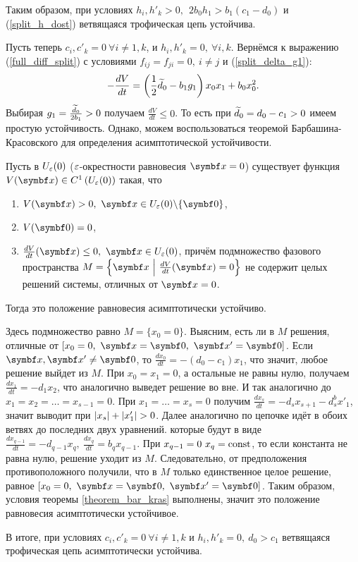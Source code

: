 Таким образом, при условиях \(h_i, h'_k > 0, ~~ 2 b_0 h_1 > b_1 (c_1 - d_0)\) и (\ref{split_h_dost}) ветвящаяся трофическая цепь устойчива.

Пусть теперь \(c_i, c'_k = 0 ~ \forall i \neq 1, k \), и \(h_i, h'_k = 0, ~ \forall i, k \). Вернёмся к выражению (\ref{full_diff_split}) с условиями \(f_{ij} = f_{ji} = 0, ~ i \neq j\) и (\ref{split_delta_g1}):
\begin{equation}
    - \frac{dV}{dt} = \left( \frac{1}{2} \widetilde{d}_0 - b_1 g_1 \right) x_0 x_1 + b_0 x_0^2.
\end{equation}
Выбирая \(g_1 = \frac{\widetilde{d}_0}{2 b_1} > 0\) получаем \(\frac{dV}{dt} \leq 0\). То есть при \(\widetilde{d}_0 = d_0 - c_1 > 0\) имеем простую устойчивость. Однако, можем воспользоваться теоремой Барбашина-Красовского\cite{barabashin_stability} для определения асимптотической устойчивости.

\begin{theorem} \label{theorem_bar_kras}
    Пусть в \(U_\varepsilon(0)\) (\(\varepsilon\)-окрестности равновесия \(\mb{x} = 0\)) существует функция \(V(\mb{x}) \in C^1\left( U_\veps(0) \right)\) такая, что
    \begin{enumerate}
        \item \(V(\mb{x}) > 0, ~ \mb{x} \in U_\veps(0) \backslash \{\mb{0}\}\),
        \item \(V(\mb{0}) = 0\),
        \item \(\frac{dV}{dt}(\mb{x}) \leq 0, ~ \mb{x} \in U_\veps(0) \), причём подмножество фазового пространства \( M = \left\{ \mb{x} ~ \Big\vert ~ \frac{dV}{dt}(\mb{x}) = 0 \right\} \) не содержит целых решений системы, отличных от \(\mb{x} = 0\).
    \end{enumerate}
    Тогда это положение равновесия асимптотически устойчиво.
\end{theorem}

Здесь подмножество равно \( M = \{ x_0 = 0 \} \). Выясним, есть ли в \(M\) решения, отличные от \( [x_0 = 0, ~ \mb{x} = \mb{0}, ~ \mb{x'} = \mb{0}] \). Если \( \mb{x}, \mb{x'} \neq \mb{0} \), то \(\frac{dx_0}{dt} = -(d_0 - c_1) x_1\), что значит, любое решение выйдет из \(M\). При \(x_0 = x_1 = 0\), а остальные не равны нулю, получаем \(\frac{dx_1}{dt} = -d_1 x_2\), что аналогично выведет решение во вне. И так аналогично до \( x_1 = x_2 = \dots = x_{s-1} = 0 \). При \(x_1 = \dots = x_{s} = 0\) получим \( \frac{d x_s}{dt} = -d_{s} x_{s+1} - d^b_s x'_1 \), значит выводит при \( \left\vert x_s \right\vert + \left\vert x'_1 \right\vert > 0\). Далее аналогично по цепочке идёт в обоих ветвях до последних двух уравнений. которые будут в виде \(\frac{dx_{q-1}}{dt} = -d_{q-1} x_q, ~ \frac{d x_q}{dt} = b_q x_{q-1}\). При \(x_{q-1} = 0 ~ x_q = \operatorname{const} \), то если константа не равна нулю, решение уходит из \(M\). Следовательно, от предположения противоположного получили, что в \(M\) только единственное целое решение, равное \( [x_0 = 0, ~ \mb{x} = \mb{0}, ~ \mb{x'} = \mb{0}] \). Таким образом, условия теоремы \eqref{theorem_bar_kras} выполнены, значит это положение равновесия асимптотически устойчивое.

В итоге, при условиях \(c_i, c'_k = 0 ~ \forall i \neq 1, k\) и \( h_i, h'_k = 0, ~ d_0 > c_1\) ветвящаяся трофическая цепь асимптотически устойчива.
